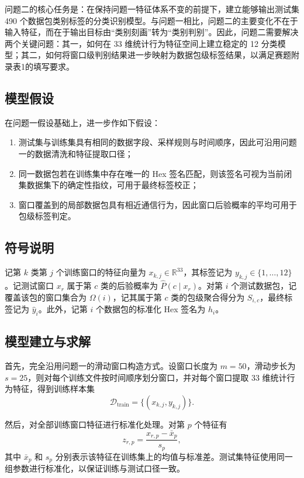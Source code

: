 \documentclass[UTF8,a4paper,12pt]{ctexart}
\begin{document}
问题二的核心任务是：在保持问题一特征体系不变的前提下，建立能够输出测试集 490 个数据包类别标签的分类识别模型。与问题一相比，问题二的主要变化不在于输入特征，而在于输出目标由“类别刻画”转为“类别判别”。因此，问题二需要解决两个关键问题：其一，如何在 33 维统计行为特征空间上建立稳定的 12 分类模型；其二，如何将窗口级判别结果进一步映射为数据包级标签结果，以满足赛题附录表1的填写要求。

\subsection{模型假设}

在问题一假设基础上，进一步作如下假设：

\begin{enumerate}[label=(\arabic*)]
    \item 测试集与训练集具有相同的数据字段、采样规则与时间顺序，因此可沿用问题一的数据清洗和特征提取口径；
    \item 同一数据包若在训练集中存在唯一的 Hex 签名匹配，则该签名可视为当前闭集数据集下的确定性指纹，可用于最终标签校正；
    \item 窗口覆盖到的局部数据包具有相近通信行为，因此窗口后验概率的平均可用于包级标签判定。
\end{enumerate}

\subsection{符号说明}

记第 $k$ 类第 $j$ 个训练窗口的特征向量为 $x_{k,j}\in \mathbb R^{33}$，其标签记为 $y_{k,j}\in\{1,\dots,12\}$。记测试窗口 $x_r$ 属于第 $c$ 类的后验概率为 $\hat P(c\mid x_r)$。对第 $i$ 个测试数据包，记覆盖该包的窗口集合为 $\Omega(i)$，记其属于第 $c$ 类的包级聚合得分为 $S_{i,c}$，最终标签记为 $\hat y_i$。此外，记第 $i$ 个数据包的标准化 Hex 签名为 $h_i$。

\subsection{模型建立与求解}

首先，完全沿用问题一的滑动窗口构造方式。设窗口长度为 $m=50$，滑动步长为 $s=25$，则对每个训练文件按时间顺序划分窗口，并对每个窗口提取 33 维统计行为特征，得到训练样本集
\[
\mathcal D_{\text{train}}=\{(x_{k,j},y_{k,j})\}.
\]

然后，对全部训练窗口特征进行标准化处理。对第 $p$ 个特征有
\[
z_{r,p}=\frac{x_{r,p}-\bar x_p}{s_p},
\]
其中 $\bar x_p$ 和 $s_p$ 分别表示该特征在训练集上的均值与标准差。测试集特征使用同一组参数进行标准化，以保证训练与测试口径一致。
\end{document}
